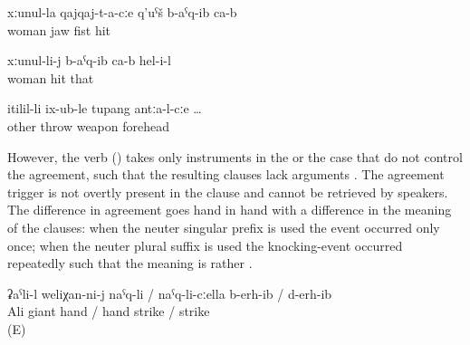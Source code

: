 \begin{exe}
	\ex	\label{ex:transitive contact verbs}
	\begin{xlist}
		\ex	{} 
		\ex	{} 
		\ex	{} 
	\end{xlist}

	\ex	\label{ex:He hit with the fist on the jaw of his wife}
	\gll	xːunul-la	qajqaj-t-a-cːe	q'uˁš	b-aˁq-ib	ca-b\\
		woman	jaw	fist	hit	\\
	\glt	{}

	\ex	\label{ex:He hit his wife}
	\gll	xːunul-li-j	b-aˁq-ib	ca-b	hel-i-l\\
		woman	hit		that\\
	\glt	{}

	\ex	\label{ex:when the other shot into the forehead}
	\gll	itilil-li	ix-ub-le	tupang	antːa-l-cːe	\ldots\\
		other	throw	weapon	forehead\\
	\glt	{}
\end{exe}

However, the verb  ()  takes only instruments in the  or the  case that do not control the agreement, such that the resulting clauses lack  arguments . The agreement trigger is not overtly present in the clause and cannot be retrieved by speakers. The difference in  agreement goes hand in hand with a difference in the meaning of the clauses: when the neuter singular prefix  is used the event occurred only once; when the neuter plural suffix is used the knocking-event occurred repeatedly such that the meaning is rather .

\begin{exe}
	\ex	\label{ex:‎‎‎Ali knocked / beat off the giant with the hand}
	\gll	ʡaˁli-l	weliχan-ni-j	naˁq-li	/	naˁq-li-cːella b-erh-ib	/	d-erh-ib\\
		Ali	giant	hand / hand	strike	/	strike\\
	\glt	{} (E)
\end{exe}

